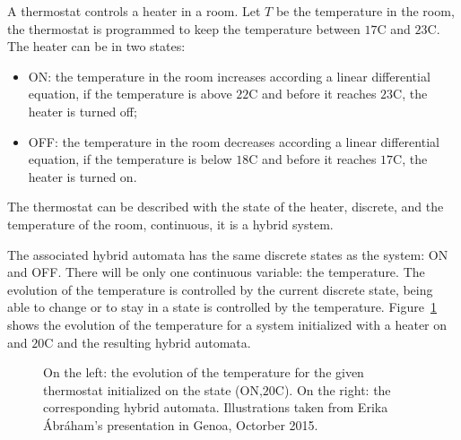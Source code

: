 \begin{example} A thermostat controls a heater in a room. Let $T$ be the temperature in the room, the thermostat is programmed to keep the temperature between $17$\textdegree C and $23$\textdegree C.
The heater can be in two states:
\begin{itemize}
\item ON: the temperature in the room increases according a linear differential equation, if the temperature is above $22$\textdegree C and before it reaches $23$\textdegree C, the heater is turned off; 
\item OFF: the temperature in the room decreases according a linear differential equation, if the temperature is below $18$\textdegree C and before it reaches $17$\textdegree C, the heater is turned on.
\end{itemize}
The thermostat can be described with the state of the heater, discrete, and the temperature of the room, continuous, it is a hybrid system.


The associated hybrid automata has the same discrete states as the system: ON and OFF. There will be only one continuous variable: the temperature. The evolution of the temperature is controlled by the current discrete state, being able to change or to stay in a state is controlled by the temperature. Figure~\ref{fig_thermostat} shows the evolution of the temperature for a system initialized with a heater on and $20$\textdegree C and the resulting hybrid automata.

\begin{figure}

\caption{On the left: the evolution of the temperature for the given thermostat initialized on the state (ON,$20$\textdegree C). On the right: the corresponding hybrid automata. Illustrations taken from Erika \'Abr\'aham's presentation in Genoa, Octorber 2015.}
\label{fig_thermostat}
\end{figure}

\label{exp_thermostat}
\end{example}

